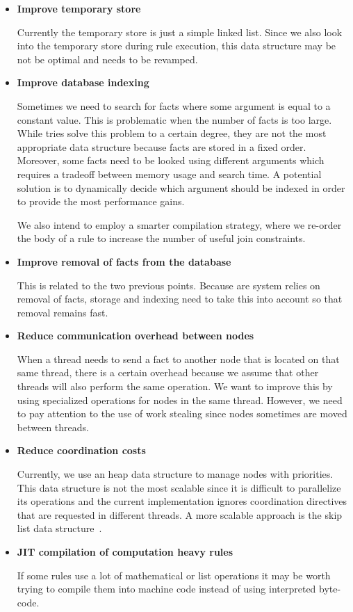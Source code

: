 \begin{itemize}
   \item \textbf{Improve temporary store}
   
   Currently the temporary store is just a simple linked list. Since we also look into the temporary store during rule execution, this data structure may be not be optimal and needs to be revamped.
   
   \item \textbf{Improve database indexing}
   
   Sometimes we need to search for facts where some argument is equal to a constant value. This is problematic when the number of facts is too large. While tries solve this problem to a certain degree, they are not the most appropriate data structure because facts are stored in a fixed order. Moreover, some facts need to be looked using different arguments which requires a tradeoff between memory usage and search time. A potential solution is to dynamically decide which argument should be indexed in order to provide the most performance gains.

We also intend to employ a smarter compilation strategy, where we re-order the body of a rule to increase the number of useful join constraints.

   \item \textbf{Improve removal of facts from the database}

   This is related to the two previous points. Because are system relies on removal of facts, storage and indexing need to take this into account so that removal remains fast.

   \item \textbf{Reduce communication overhead between nodes}
   
   When a thread needs to send a fact to another node that is located on that same thread, there is a certain overhead because we assume that other threads will also perform the same operation. We want to improve this by using specialized operations for nodes in the same thread. However, we need to pay attention to the use of work stealing since nodes sometimes are moved between threads.

   \item \textbf{Reduce coordination costs}

   Currently, we use an heap data structure to manage nodes with priorities. This data structure is not the most scalable since it is difficult to parallelize its operations and
   the current implementation ignores coordination directives that are requested in different threads.
   A more scalable approach is the skip list data structure~\cite{Sundell:2005:FLC:1073765.1073770}.
   
   \item \textbf{JIT compilation of computation heavy rules}
   
   If some rules use a lot of mathematical or list operations it may be worth trying to compile them into machine code instead of using interpreted byte-code.
\end{itemize}

